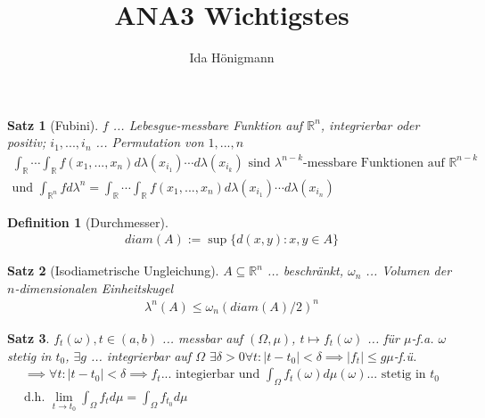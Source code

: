 \documentclass[]{article}
\title{ANA3 Wichtigstes}
\author{Ida Hönigmann}
\newtheorem*{theorem}{Satz}
\newtheorem*{definition}{Definition}
\begin{document}
\maketitle

\begin{theorem}[Fubini]
	$f$ ... Lebesgue-messbare Funktion auf $\mathbb{R}^n$, integrierbar oder positiv; $i_1, ..., i_n$ ... Permutation von $1, ..., n$
	\begin{align*}
		\int_{\mathbb{R}} \cdots \int_{\mathbb{R}} f(x_1, ..., x_n) d\lambda(x_{i_1}) \cdots d\lambda(x_{i_k}) \text{ sind } \lambda^{n-k}\text{-messbare Funktionen auf }\mathbb{R}^{n-k}\\
		\text{und } \int_{\mathbb{R}^n} f d\lambda^n = \int_{\mathbb{R}} \cdots \int_{\mathbb{R}} f(x_1, ..., x_n) d\lambda(x_{i_1}) \cdots d\lambda(x_{i_n})
	\end{align*}
\end{theorem}

\begin{definition}[Durchmesser]
	\begin{align*}
		diam(A):=\sup\{d(x,y): x,y\in A\}
	\end{align*}
\end{definition}

\begin{theorem}[Isodiametrische Ungleichung]
	$A \subseteq \mathbb{R}^n$ ... beschränkt, $\omega_n$ ... Volumen der $n$-dimensionalen Einheitskugel
	\begin{align*}
		\lambda^n(A) \leq \omega_n(diam(A)/2)^n
	\end{align*}
\end{theorem}

\begin{theorem}
	$f_t(\omega), t\in(a,b)$ ... messbar auf $(\Omega, \mu)$, $t\mapsto f_t(\omega)$ ... für $\mu$-f.a. $\omega$ stetig in $t_0$, $\exists g$ ... integrierbar auf $\Omega$ $\exists \delta > 0 \forall t: |t-t_0|<\delta \implies |f_t| \leq g \mu$-f.ü.
	\begin{align*}
		\implies \forall t: |t-t_0| < \delta \implies f_t \text{... integierbar und } \int_{\Omega} f_t(\omega) d\mu(\omega) \text{... stetig in }t_0\\
		\text{d.h. } \lim\limits_{t\rightarrow t_0} \int_{\Omega} f_t d\mu = \int_{\Omega} f_{t_0} d\mu
	\end{align*}
\end{theorem}
\end{document}
